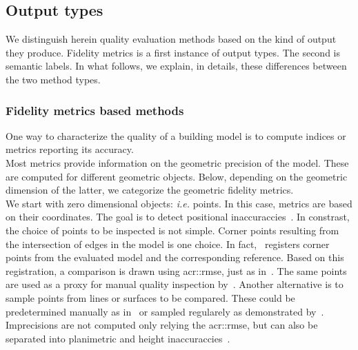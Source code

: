     \subsection{Output types}
        \label{subsec::state_of_the_art::quality::output}
        We distinguish herein quality evaluation methods based on the kind of output they produce.
        Fidelity metrics is a first instance of output types.
        The second is semantic labels.
        In what follows, we explain, in details, these differences between the two method types.

        \subsubsection{Fidelity metrics based methods}
            One way to characterize the quality of a building model is to compute indices or metrics reporting its accuracy.\\

            Most metrics provide information on the geometric precision of the model.
            These are computed for different geometric objects.
            Below, depending on the geometric dimension of the latter, we categorize the geometric fidelity metrics.\\

            We start with zero dimensional objects: \textit{i.e.} points.
            In this case, metrics are based on their coordinates.
            The goal is to detect positional inaccuraccies~\parencite{kaartinen2005accuracy}.
            In constrast, the choice of points to be inspected is not simple.
            Corner points resulting from the intersection of edges in the model is one choice.
            In fact,~\textcite{zeng2014multicriteria} registers corner points from the evaluated model and the corresponding reference.
            Based on this registration, a comparison is drawn using \gls{acr::rmse}, just as in~\parencite{you2011quality,landes2012quality}.
            The same points are used as a proxy for manual quality inspection by~\textcite{elberink2011quality}.
            Another alternative is to sample points from lines or surfaces to be compared.
            These could be predetermined manually as in~\textcite{kaartinen2005accuracy} or sampled regularely as demonstrated by~\textcite{vogtle2003quality,tran2019geometric}.
            Imprecisions are not computed only relying the \gls{acr::rmse}, but can also be separated into planimetric and height inaccuraccies~\parencite{vogtle2003quality,jaynes2003recognition,kaartinen2005accuracy}.\\

